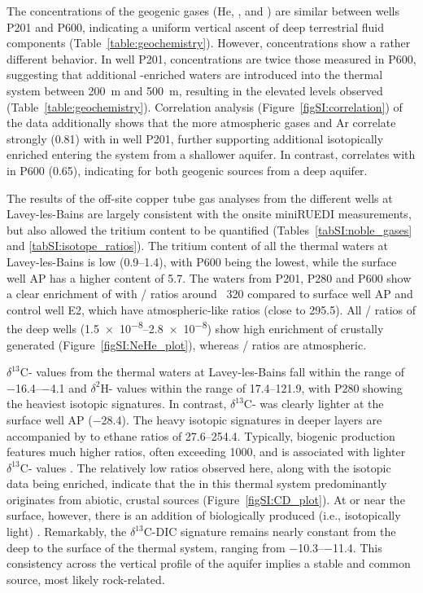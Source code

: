 The concentrations of the geogenic gases (He, , and ) are similar between wells P201 and P600, indicating a uniform vertical ascent of deep terrestrial fluid components (Table~\ref{table:geochemistry}).
However,  concentrations show a rather different behavior.
In well P201,  concentrations are twice those measured in P600, suggesting that additional -enriched waters are introduced into the thermal system between \SI{200}{\metre} and \SI{500}{\metre}, resulting in the elevated levels observed (Table~\ref{table:geochemistry}).
Correlation analysis {(Figure~\ref{figSI:correlation})} of the data additionally shows that the more atmospheric gases  and Ar correlate strongly (0.81) with  in well P201, further supporting additional isotopically enriched  entering the system from a shallower aquifer. 
In contrast,  correlates with  in P600 (0.65), indicating for both geogenic sources from a deep aquifer. 

The results of the off-site copper tube gas analyses from the different wells at Lavey-les-Bains are largely consistent with the onsite miniRUEDI measurements, but also allowed the tritium content to be quantified (Tables~\ref{tabSI:noble_gases} and \ref{tabSI:isotope_ratios}).
The tritium content of all the thermal waters at Lavey-les-Bains is low (\SIrange{0.9}{1.4}{\TU}), with P600 being the lowest, while the surface well AP has a higher content of \SI{5.7}{\TU}.
The waters from P201, P280 and P600 show a clear enrichment of  with / ratios around \SI{}{320} compared to surface well AP and control well E2, which have atmospheric-like ratios (close to 295.5).
All / ratios of the deep wells (\SIrange{1.5e-8}{2.8e-8}{}) show high enrichment of crustally generated  (Figure~\ref{figSI:NeHe_plot}), whereas / ratios are atmospheric.

$\delta^{13}$C- values from the thermal waters at Lavey-les-Bains fall within the range of \SIrange{-16.4}{-4.1}{\permille} and $\delta^{2}$H- values within the range of \SIrange{17.4}{121.9}{\permille}, with P280 showing the heaviest isotopic signatures.
In contrast, $\delta^{13}$C- was clearly lighter at the surface well AP (\SI{-28.4}{\permille}).
The heavy isotopic signatures in deeper layers are accompanied by  to ethane ratios of \SIrange{27.6}{254.4}{}.
Typically, biogenic  production features much higher ratios, often exceeding 1000, and is associated with lighter $\delta^{13}$C- values \citep{whiticar1999carbon, faber2015geochemical}.
The relatively low ratios observed here, along with the  isotopic data being enriched, indicate that the  in this thermal system predominantly originates from abiotic, crustal sources (Figure~\ref{figSI:CD_plot}).
At or near the surface, however, there is an addition of biologically produced (i.e., isotopically light) .
Remarkably, the $\delta^{13}$C-DIC signature remains nearly constant from the deep to the surface of the thermal system, ranging from \SIrange{-10.3}{-11.4}{\permille}.
This consistency across the vertical profile of the aquifer implies a stable and common  source, most likely rock-related.

